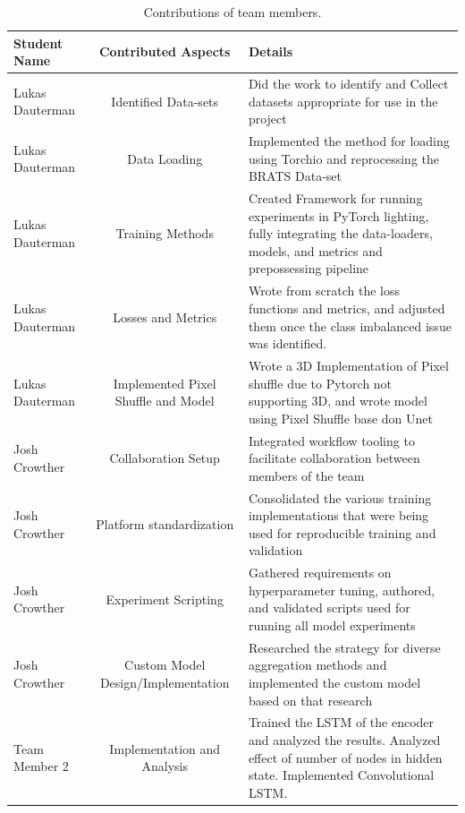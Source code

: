 \documentclass[10pt,twocolumn,letterpaper]{article}
\begin{document}
\begin{table}
\begin{center}
\begin{tabular}{|l|c|p{8cm}|}
\hline
Student Name & Contributed Aspects & Details \\
\hline\hline

Lukas Dauterman & Identified Data-sets & Did the work to identify and Collect datasets appropriate for use in the project \\
Lukas Dauterman & Data Loading & Implemented the method for loading using Torchio and reprocessing the BRATS Data-set \\
Lukas Dauterman & Training Methods & Created Framework for running experiments in  PyTorch lighting, fully integrating the data-loaders, models, and metrics and prepossessing pipeline \\
Lukas Dauterman & Losses and Metrics & Wrote from scratch the loss functions and metrics, and adjusted them once the class imbalanced issue was identified. \\
Lukas Dauterman & Implemented Pixel Shuffle and Model & Wrote a 3D Implementation of Pixel shuffle due to Pytorch not supporting 3D, and wrote model using Pixel Shuffle base don Unet \\

Josh Crowther & Collaboration Setup & Integrated workflow tooling to facilitate collaboration between members of the team \\
Josh Crowther & Platform standardization & Consolidated the various training implementations that were being used for reproducible training and validation \\
Josh Crowther & Experiment Scripting & Gathered requirements on hyperparameter tuning, authored, and validated scripts used for running all model experiments \\
Josh Crowther & Custom Model Design/Implementation & Researched the strategy for diverse aggregation methods and implemented the custom model based on that research \\

Team Member 2 & Implementation and Analysis & Trained the LSTM of the encoder and analyzed the results. Analyzed effect of number of nodes in hidden state.  Implemented Convolutional LSTM. \\
\hline
\end{tabular}
\end{center}
\caption{Contributions of team members.}
\label{tab:contributions}
\end{table}
\end{document}
